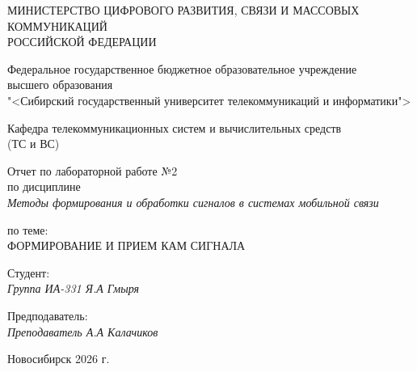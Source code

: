 \thispagestyle{empty}

\begin{center}
    МИНИСТЕРСТВО ЦИФРОВОГО РАЗВИТИЯ, СВЯЗИ И МАССОВЫХ КОММУНИКАЦИЙ \\ РОССИЙСКОЙ ФЕДЕРАЦИИ

    \vspace{20pt}

    Федеральное государственное бюджетное образовательное учреждение  \\  высшего образования \\
    "<Сибирский государственный университет телекоммуникаций и информатики"> \\

    \vspace{20pt}

    Кафедра телекоммуникационных систем и вычислительных средств \\  (ТС и ВС)
\end{center}

\vfill

\begin{center}
    Отчет по лабораторной работе №2 \\  
    по дисциплине \\
    \textit{Методы формирования и обработки сигналов в системах мобильной связи}

    \vspace{20pt}

    по теме: \\
    \uppercase{Формирование и прием КАМ сигнала}
\end{center}

\vfill

    \noindent Студент: \\
    \textit{Группа ИА-331 \hfill Я.А Гмыря}

    \vspace{20pt}

    \noindent Предподаватель: \\
    \textit{Преподаватель \hfill А.А Калачиков}

\vfill

\begin{center}
    Новосибирск 2026 г.
\end{center}